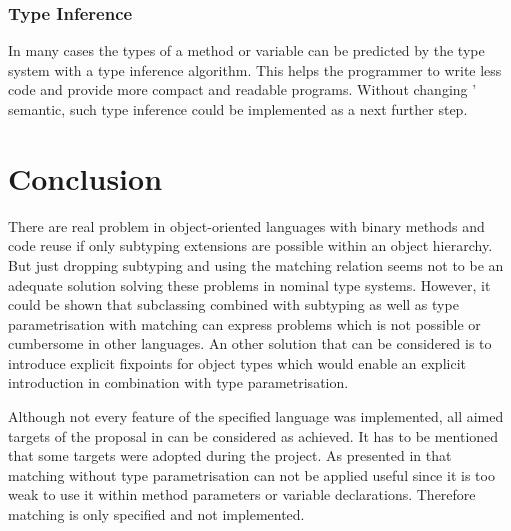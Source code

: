 \subsubsection{Type Inference}
In many cases the types of a method or variable can be predicted
by the type system with a type inference algorithm. This helps
the programmer to write less code and provide more compact and readable
programs. Without changing \ooplss' semantic, such type inference
could be implemented as a next further step.

\section{Conclusion}
\label{ctr:conclusion}
There are real problem in object-oriented languages with binary methods
and code reuse if only subtyping extensions are possible within an object
hierarchy. But just dropping subtyping and using the matching relation
seems not to be an adequate solution solving these problems in nominal
type systems. However, it could be shown that subclassing combined with
subtyping as well as type parametrisation with matching can express
problems which is not possible or cumbersome in other languages. An other
solution that can be considered is to introduce explicit fixpoints for
object types which would enable an explicit \mytype introduction in
combination with type parametrisation.

Although not every feature of the specified language was implemented,
all aimed targets of the proposal in  can be
considered as achieved. It has to be mentioned that some targets were
adopted during the project. As presented in  that
matching without type parametrisation can not be applied useful since it
is too weak to use it within method parameters or variable declarations.
Therefore matching is only specified and not implemented.
